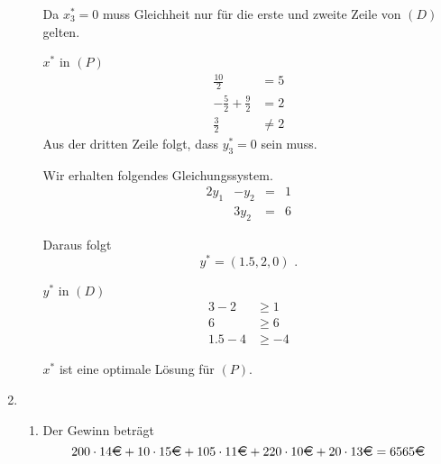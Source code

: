 \documentclass[a4paper]{scrartcl}
\begin{document}
\begin{enumerate}[label=\bfseries\arabic*.]
\begin{enumerate}
                Da $x_3^* = 0$ muss Gleichheit nur für die erste und zweite
                Zeile von $(D)$ gelten.

                $x^*$ in $(P)$
                \begin{equation}
                    \begin{split}
                        \frac{10}{2} &= 5 \\
                        -\frac{5}{2} +\frac{9}{2} &= 2 \\
                        \frac{3}{2} &\neq 2
                    \end{split}
                \end{equation}
                Aus der dritten Zeile folgt, dass $y_3^* = 0$ sein muss.
                
                Wir erhalten folgendes Gleichungssystem.
                \begin{equation}
                    \begin{array}{rrrcr}
                        2y_1 & -y_2 & = & 1 \\
                        & 3y_2 & = & 6
                    \end{array}
                \end{equation}

                Daraus folgt
                \begin{equation}
                    y^* = \left( 1.5, 2, 0 \right) \text{ .}
                \end{equation}

                $y^*$ in $(D)$
                \begin{equation}
                    \begin{split}
                        3 - 2 &\geq 1 \\
                        6 &\geq 6 \\
                        1.5 -4 &\geq -4
                    \end{split}
                \end{equation}
                
                $x^*$ ist eine optimale Lösung für $(P)$.

        \end{enumerate}

    \item %
        \begin{enumerate}
            \item
                Der Gewinn beträgt
                \begin{equation}
                    200 \cdot 14 \text{\EUR}
                    + 10 \cdot 15 \text{\EUR} + 105 \cdot 11 \text{\EUR}
                    + 220 \cdot 10 \text{\EUR} + 20 \cdot 13 \text{\EUR}
                    =
                    6565 \text{\EUR}
                \end{equation}
                

\end{enumerate}
\end{enumerate}
\end{document}
